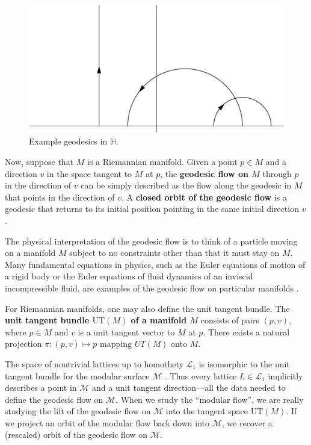 \documentclass[12pt,twoside]{reedthesis}
\theoremstyle{definition}
\newcommand{\LS}{\mathcal{L}}
\newcommand{\UT}{\mathrm{UT}}
\newcommand{\defnphrase}[1]{\textbf{#1}}
\begin{document}
\begin{figure}[t]
  \centering
  \includegraphics[width=0.6\linewidth]{figures/geodesics_in_h.pdf}
  \caption{Example geodesics in $\mathbb{H}$.}
  \label{fig:geodesics_in_h}
\end{figure}

Now, suppose that $M$ is a Riemannian manifold.
Given a point $p \in M$ and a direction $v$ in the space tangent to $M$ at $p$, the \defnphrase{geodesic flow on $M$} through $p$ in the direction of $v$ can be simply described as the flow along the geodesic in $M$ that points in the direction of $v$.
A \defnphrase{closed orbit of the geodesic flow} is a geodesic that returns to its initial position pointing in the same initial direction $v$.

The physical interpretation of the geodesic flow is to think of a particle moving on a manifold $M$ subject to no constraints other than that it must stay on $M$.
Many fundamental equations in physics, such as the Euler equations of motion of a rigid body or the Euler equations of fluid dynamics of an inviscid incompressible fluid, are examples of the geodesic flow on particular manifolds \cite{arnold66, tao}.

For Riemannian manifolds, one may also define the unit tangent bundle.
The \defnphrase{unit tangent bundle $\UT(M)$ of a manifold $M$} consists of pairs $(p, v)$, where $p \in M$ and $v$ is a unit tangent vector to $M$ at $p$. 
There exists a natural projection $\pi : (p, v) \mapsto p$ mapping $UT(M)$ onto $M$.

The space of nontrivial lattices up to homothety $\LS_1$ is isomorphic to the unit tangent bundle for the modular surface $\mathcal{M}$ \cite[9]{silverman1994}.
Thus every lattice $L \in \LS_1$ implicitly describes a point in $\mathcal{M}$ and a unit tangent direction---all the data needed to define the geodesic flow on $\mathcal{M}$.
When we study the ``modular flow'', we are really studying the lift of the geodesic flow on $\mathcal{M}$ into the tangent space $\mathrm{UT}(M)$.
If we project an orbit of the modular flow  back down into $\mathcal{M}$, we recover a (rescaled) orbit of the geodesic flow on $\mathcal{M}$.
\end{document}
